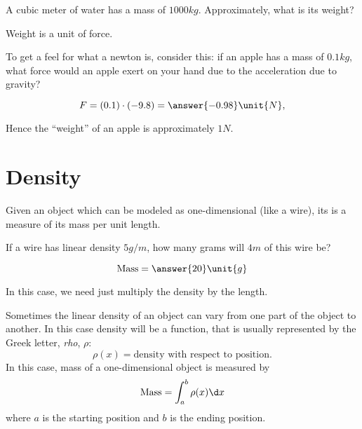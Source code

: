 \documentclass{ximera}
\begin{document}
\begin{question}
  A cubic meter of water has a mass of $1000\unit{kg}$. Approximately,
  what is its weight?
  \begin{multipleChoice}
  \end{multipleChoice}
  \begin{feedback}
    Weight is a unit of force.
  \end{feedback}
\end{question}


\begin{question}
  To get a feel for what a newton is, consider this: if an apple has a
  mass of $0.1\unit{kg}$, what force would an apple exert on your hand
  due to the acceleration due to gravity?
  \begin{prompt}
  \[
  F = (0.1) \cdot (-9.8) = \answer{-0.98}\unit{N},
  \]
  \end{prompt}
\begin{feedback}
  Hence the ``weight'' of an apple is approximately $1\unit{N}$.
\end{feedback}
\end{question}






\section{Density}

Given an object which can be modeled as one-dimensional (like a wire),
its  is a measure of its mass per unit length.

\begin{question}
  If a wire has linear density $5 \unit{g}/\unit{m}$, how many grams
  will $4 \unit{m}$ of this wire be?
  \begin{prompt}
  \[
  \mathrm{Mass} = \answer{20} \unit{g}
  \]
  \end{prompt}
  \begin{hint}
    In this case, we need just multiply the density by the length.
  \end{hint}
\end{question}

Sometimes the linear density of an object can vary from one part of
the object to another. In this case density will be a function, that
is usually represented by the Greek letter, \textit{rho}, $\rho$:
\[
\rho(x) = \text{density with respect to position.}
\]
In this case, mass of a one-dimensional object is measured by
\[
\mathrm{Mass} = \int_{a}^{b} \rho(x) \d x
\]
where $a$ is the starting position and $b$ is the ending position.
\end{document}
